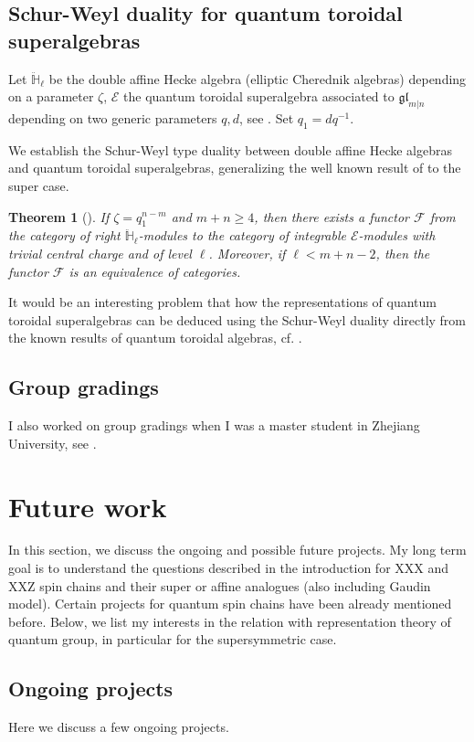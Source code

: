 \documentclass[11pt,reqno]{amsart}
\numberwithin{equation}{section}
\newtheorem{thm}{Theorem}[section]
\theoremstyle{definition}
\theoremstyle{remark}
\newcommand{\gge}{\geqslant}
\newcommand{\glMN}{\mathfrak{gl}_{m|n}}
\begin{document}
\subsection{Schur-Weyl duality for quantum toroidal superalgebras}
Let $\ddot{\mathbb H}_{\ell}$ be the double affine Hecke algebra (elliptic Cherednik algebras) depending on a parameter $\zeta$, $\mathcal E$ the quantum toroidal superalgebra associated to $\glMN$ depending on two generic parameters $q,d$, see \cite{BM21}. Set $q_1=dq^{-1}$. 

We establish the Schur-Weyl type duality between double affine Hecke algebras and quantum toroidal superalgebras, generalizing the well known result of \cite{VV:1996} to the super case.
\begin{thm}[\cite{L:2021b}]\label{thm:toroidal}
If $\zeta=q_1^{n-m}$ and $m+n\gge 4$, then there exists a functor $\mathcal F$ from the category of right $\ddot{\mathbb H}_{\ell}$-modules to the category of integrable $\mathcal E$-modules with trivial central charge and of level $\ell$. Moreover, if $\ell<m+n-2$, then the functor $\mathcal F$ is an equivalence of categories.
\end{thm}
It would be an interesting problem that how the representations of quantum toroidal superalgebras can be deduced using the Schur-Weyl duality directly from the known results of quantum toroidal algebras, cf. \cite{LM:2020}.
\subsection{Group gradings} I also worked on group gradings when I was a master student in Zhejiang University, see \cite{HLY,HLL}.

\section{Future work}\label{Sec future}
In this section, we discuss the ongoing and possible future projects. My long term goal is to understand the questions described in the introduction for XXX and XXZ spin chains and their super or affine analogues (also including Gaudin model). Certain projects for quantum spin chains have been already mentioned before. Below, we list my interests in the relation with representation theory of quantum group, in particular for the supersymmetric case. 

\subsection{Ongoing projects}Here we discuss a few ongoing projects.
\end{document}
